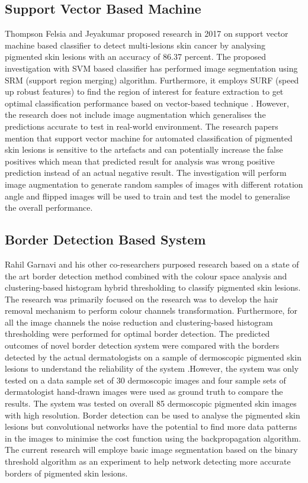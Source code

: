 \subsection{Support Vector Based Machine}
Thompson Felsia and Jeyakumar proposed research in 2017 on 
support vector machine based classifier to detect multi-lesions skin cancer by analysing pigmented skin lesions with an accuracy of 86.37 percent.
The proposed investigation with SVM based classifier has performed image segmentation using SRM (support region merging) algorithm. Furthermore, it employs SURF (speed up robust features) to find the region 
of interest for feature extraction to get optimal classification performance based on vector-based technique \citep{thompson2017vector}. 
However, the research does not include image augmentation which generalises the predictions accurate to test in 
real-world environment. The research papers mention that support vector machine for automated classification of pigmented skin lesions is sensitive to the artefacts and can 
potentially increase the false positives which mean that predicted result for analysis was wrong positive prediction instead of an actual negative result. The investigation will perform image augmentation to generate random 
samples of images with different rotation angle and flipped images will be used to train and test the model to generalise the overall performance.

\subsection{Border Detection Based System}
Rahil Garnavi and his other co-researchers purposed research based on a state of the art border detection method combined with the colour space analysis and clustering-based histogram hybrid thresholding to classify pigmented skin lesions.
 The research was primarily focused on the research was to develop the hair removal mechanism to perform colour channels transformation. Furthermore, for all the image channels the noise reduction 
and clustering-based histogram thresholding were performed for optimal border detection. The predicted outcomes of novel border detection system were compared with the 
borders detected by the actual dermatologists on a sample of 
dermoscopic pigmented skin lesions to understand the reliability of the 
system \citep{GARNAVI2011105}.However, the system was only tested on a data sample set of 
30 dermoscopic images and four sample sets of dermatologist hand-drawn images were used as ground
truth to compare the results. The system was tested on overall 85 dermoscopic pigmented skin images 
with high resolution. Border detection can be used to analyse the pigmented skin lesions but 
convolutional networks have the potential to find more data patterns in the images to minimise 
the cost function using the backpropagation algorithm. The current research will employe basic image
segmentation based on the binary threshold algorithm as an experiment to help network detecting more accurate
borders of pigmented skin lesions.

